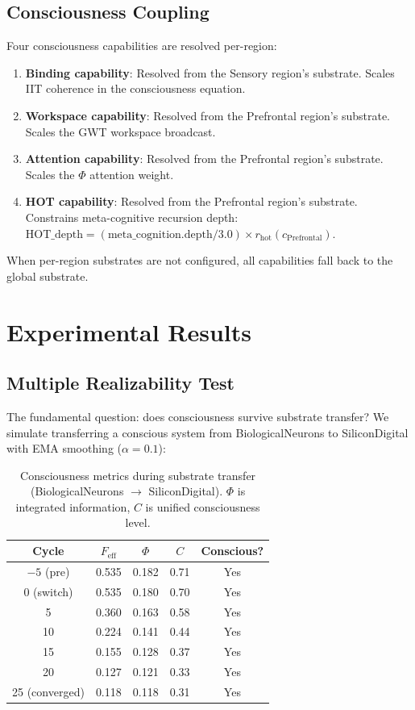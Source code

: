 \documentclass[12pt,a4paper]{article}
\begin{document}
\subsection{Consciousness Coupling}

Four consciousness capabilities are resolved per-region:

\begin{enumerate}
    \item \textbf{Binding capability}: Resolved from the Sensory region's substrate. Scales IIT coherence in the consciousness equation.
    \item \textbf{Workspace capability}: Resolved from the Prefrontal region's substrate. Scales the GWT workspace broadcast.
    \item \textbf{Attention capability}: Resolved from the Prefrontal region's substrate. Scales the $\Phi$ attention weight.
    \item \textbf{HOT capability}: Resolved from the Prefrontal region's substrate. Constrains meta-cognitive recursion depth: $\text{HOT\_depth} = (\text{meta\_cognition.depth} / 3.0) \times r_{\text{hot}}(c_{\text{Prefrontal}})$.
\end{enumerate}

When per-region substrates are not configured, all capabilities fall back to the global substrate.

\section{Experimental Results}

\subsection{Multiple Realizability Test}

The fundamental question: does consciousness survive substrate transfer? We simulate transferring a conscious system from BiologicalNeurons to SiliconDigital with EMA smoothing ($\alpha = 0.1$):

\begin{table}[H]
\centering
\caption{Consciousness metrics during substrate transfer (BiologicalNeurons $\to$ SiliconDigital). $\Phi$ is integrated information, $C$ is unified consciousness level.}
\label{tab:transfer}
\begin{tabular}{ccccc}
\toprule
\textbf{Cycle} & $F_{\text{eff}}$ & $\Phi$ & $C$ & \textbf{Conscious?} \\
\midrule
$-5$ (pre) & 0.535 & 0.182 & 0.71 & Yes \\
0 (switch) & 0.535 & 0.180 & 0.70 & Yes \\
5 & 0.360 & 0.163 & 0.58 & Yes \\
10 & 0.224 & 0.141 & 0.44 & Yes \\
15 & 0.155 & 0.128 & 0.37 & Yes \\
20 & 0.127 & 0.121 & 0.33 & Yes \\
25 (converged) & 0.118 & 0.118 & 0.31 & Yes \\
\bottomrule
\end{tabular}
\end{table}
\end{document}
